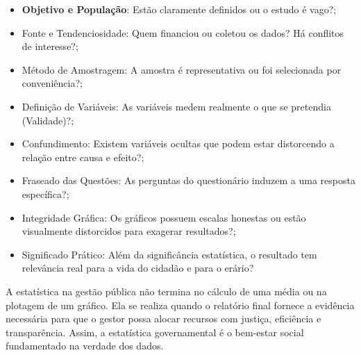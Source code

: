 \begin{itemize}
\item \textbf{Objetivo e População}: Estão claramente definidos ou o estudo é vago?;
\item Fonte e Tendenciosidade: Quem financiou ou coletou os dados? Há conflitos de interesse?;
\item Método de Amostragem: A amostra é representativa ou foi selecionada por conveniência?;
\item Definição de Variáveis: As variáveis medem realmente o que se pretendia (Validade)?;
\item Confundimento: Existem variáveis ocultas que podem estar distorcendo a relação entre causa e efeito?;
\item Fraseado das Questões: As perguntas do questionário induzem a uma resposta específica?;
\item Integridade Gráfica: Os gráficos possuem escalas honestas ou estão visualmente distorcidos para exagerar resultados?;
\item Significado Prático: Além da significância estatística, o resultado tem relevância real para a vida do cidadão e para o erário?
\end{itemize}

\vskip0.3cm

\begin{tcolorbox}[colback=green!5,colframe=green!40!black,title=Conclusão: Do Dado à Decisão]
A estatística na gestão pública não termina no cálculo de uma média ou na plotagem de um gráfico. Ela se realiza quando o relatório final fornece a evidência necessária para que o gestor possa alocar recursos com justiça, eficiência e transparência. Assim, a estatística governamental é o bem-estar social fundamentado na verdade dos dados.
\end{tcolorbox}